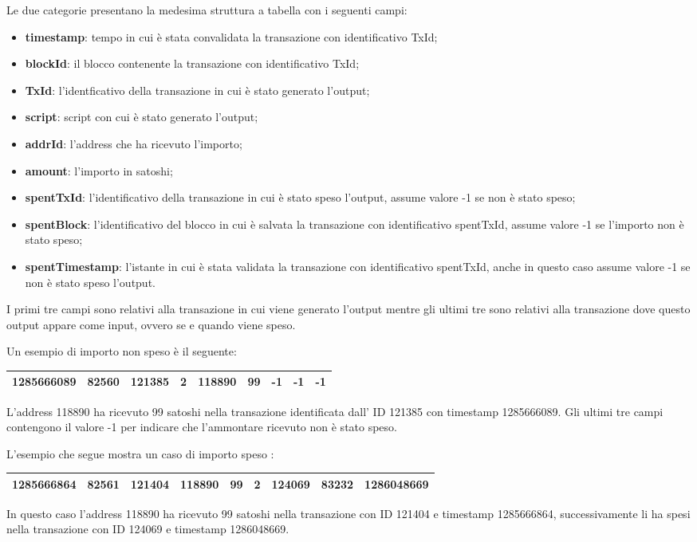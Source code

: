Le due categorie presentano la medesima struttura a tabella con i seguenti campi:
\begin{itemize}
    \item \textbf{timestamp}: tempo in cui è stata convalidata la transazione con identificativo TxId;  
    \item \textbf{blockId}: il blocco contenente la transazione con identificativo TxId;   
    \item \textbf{TxId}: l'identficativo della transazione in cui è stato generato l'output;
    \item \textbf{script}: script con cui è stato generato l'output;
    \item \textbf{addrId}: l'address che ha ricevuto l'importo;
    \item \textbf{amount}: l'importo in satoshi;
    \item \textbf{spentTxId}: l'identificativo della transazione in cui è stato speso l'output, assume valore -1 se non è stato speso;
    \item \textbf{spentBlock}: l'identificativo del blocco in cui è salvata la transazione con identificativo spentTxId, assume valore -1 se l'importo non è stato speso;
    \item \textbf{spentTimestamp}: l'istante in cui è stata validata la transazione con identificativo spentTxId, anche in questo caso assume valore -1 se non è stato speso l'output.
\end{itemize}

I primi tre campi sono relativi alla transazione in cui viene generato l'output mentre gli ultimi tre sono relativi alla transazione dove questo output appare come input, ovvero se e quando viene speso.

Un esempio di importo non speso è il seguente:
\begin{table}[h]
\centering
\begin{tabular}{|r|r|r|r|r|r|r|r|r|}
\toprule
1285666089 &    82560 & 121385 &  2 &      118890 &       99 &         -1 &          -1 &              -1 \\
\bottomrule
\end{tabular}
\end{table}
\FloatBarrier
L'address 118890 ha ricevuto 99 satoshi nella transazione identificata dall' ID 121385 con timestamp 1285666089. Gli ultimi tre campi contengono il valore -1 per indicare che l'ammontare ricevuto non è stato speso.

L'esempio che segue mostra un caso di importo speso :
\begin{table}[h]
\centering
\begin{tabular}{|l|l|l|l|l|l|l|l|l|}
\toprule
1285666864 &    82561 & 121404 &  118890 &      99 &           2 &       124069 &       83232 &      1286048669\\
\bottomrule
\end{tabular}
\end{table}
\FloatBarrier
In questo caso l'address 118890 ha ricevuto 99 satoshi nella transazione con ID 121404 e timestamp 1285666864, successivamente li ha spesi nella transazione con ID 124069 e timestamp 1286048669.
